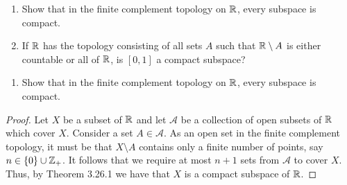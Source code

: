 \begin{exercise}[ID=3.26.2]
  \begin{enumerate}[label={(\alph*)}, align=left, leftmargin=\parindent, listparindent=\parindent, labelwidth=0pt, itemindent=!]
    \item
          Show that in the finite complement topology on $\mathbb{R}$, every subspace is compact.
    \item
          If $\mathbb{R}$ has the topology consisting of all sets $A$ such that $\mathbb{R} \setminus A$ is either countable or all of $\mathbb{R}$, is $[0, 1]$ a compact subspace?
  \end{enumerate}
\end{exercise}
%
\begin{solution}
  \begin{enumerate}[label={(\alph*)}, align=left, leftmargin=\parindent, listparindent=\parindent, labelwidth=0pt, itemindent=!]
    \item
          Show that in the finite complement topology on $\mathbb{R}$, every subspace is compact.
  \end{enumerate}
  \begin{proof}
    Let $X$ be a subset of $\mathbb{R}$ and let $\mathcal{A}$ be a collection of open subsets of $\mathbb{R}$ which cover $X$.
    Consider a set $A \in \mathcal{A}$.
    As an open set in the finite complement topology, it must be that $X \setminus A$ contains only a finite number of points, say $n \in \{0\} \cup \mathbb{Z}_+$.
    It follows that we require at most $n + 1$ sets from $\mathcal{A}$ to cover $X$.
    Thus, by Theorem 3.26.1 we have that $X$ is a compact subspace of $\mathbb{R}$.
  \end{proof}


\end{solution}
